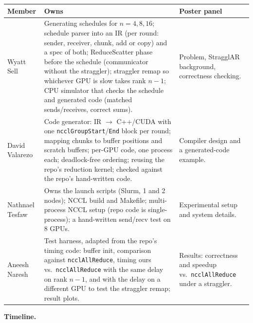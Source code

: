 \documentclass[10pt]{article}
\begin{document}
\begin{tabularx}{\linewidth}{@{}l X >{\raggedright\arraybackslash}p{1.7in}@{}}
\toprule
\textbf{Member} & \textbf{Owns} & \textbf{Poster panel} \\
\midrule
Wyatt Sell & Generating schedules for $n = 4,8,16$; schedule parser into an IR (per round: sender, receiver, chunk, add or copy) and a spec of both; ReduceScatter phase before the schedule (communicator without the straggler); straggler remap so whichever GPU is slow takes rank $n{-}1$; CPU simulator that checks the schedule and generated code (matched sends/receives, correct sums). & Problem, StragglAR background, correctness checking. \\
David Valarezo & Code generator: IR $\rightarrow$ C++/CUDA with one \texttt{ncclGroupStart}/\texttt{End} block per round; mapping chunks to buffer positions and scratch buffers; per-GPU code, one process each; deadlock-free ordering; reusing the repo's reduction kernel; checked against the repo's hand-written code. & Compiler design and a generated-code example. \\
Nathnael Tesfaw & Owns the launch scripts (Slurm, 1 and 2 nodes); NCCL build and Makefile; multi-process NCCL setup (repo code is single-process); a hand-written send/recv test on 8 GPUs. & Experimental setup and system details. \\
Aneesh Naresh & Test harness, adapted from the repo's timing code: buffer init, comparison against \texttt{ncclAllReduce}, timing ours vs.\ \texttt{ncclAllReduce} with the same delay on rank $n{-}1$, and with the delay on a different GPU to test the straggler remap; result plots. & Results: correctness and speedup vs.\ \texttt{ncclAllReduce} under a straggler. \\
\bottomrule
\end{tabularx}

\textbf{Timeline.}
\end{document}
